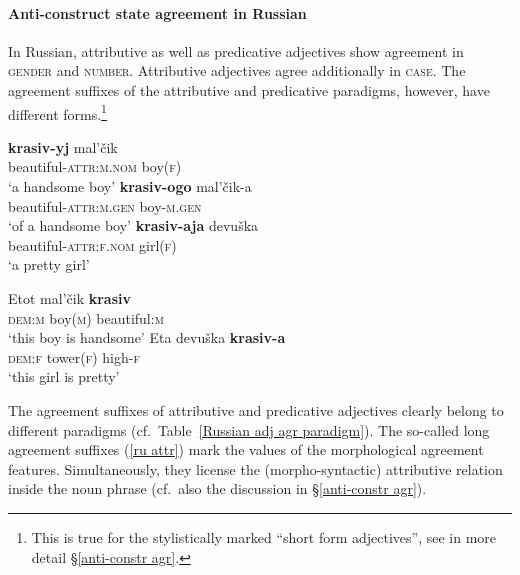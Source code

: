 \paragraph*{Anti\hyp{}construct state agreement in Russian}
\label{russian synchr}
In Russian, attributive as well as predicative adjectives show agreement in \textsc{gender} and \textsc{number}. Attributive adjectives agree additionally in \textsc{case}. The agreement suffixes of the attributive and predicative paradigms, however, have different forms.\footnote{This is true for the stylistically marked “short form adjectives”, see in more detail \S\ref{anti-constr agr}.}
\begin{exe}
\label{ru agr}
\begin{xlist}
\label{ru attr}
\begin{xlist}
\ex	
\gll	\textbf{krasiv-yj}			mal'čik\\
	beautiful-\textsc{attr:m.nom} 	boy(\textsc{f})\\
\glt	‘a handsome boy’
\ex	
\gll	\textbf{krasiv-ogo}			mal'čik-a\\
	beautiful-\textsc{attr:m.gen}	boy-\textsc{m.gen}\\
\glt	‘of a handsome boy’
\ex
\gll 	\textbf{krasiv-aja} 			devuška\\
	beautiful-\textsc{attr:f.nom}	girl(\textsc{f})\\
\glt	 ‘a pretty girl’
\end{xlist}
\begin{xlist}
\ex
\gll 	Etot 			mal'čik		\textbf{krasiv}\\
	\textsc{dem:m} boy(\textsc{m}) 	beautiful:\textsc{m}\\
\glt	 ‘this boy is handsome’
\ex	
\gll	Eta 			devuška		\textbf{krasiv-a}\\
	\textsc{dem:f} tower(\textsc{f}) 	high-\textsc{f}\\
\glt	‘this girl is pretty’
\end{xlist}
\end{xlist}
\end{exe}
The agreement suffixes of attributive and predicative adjectives clearly belong to different paradigms (cf.~Table~\ref{Russian adj agr paradigm}). The so-called long agreement suffixes (\ref{ru attr}) mark the values of the morphological agreement features. Simultaneously, they license the (morpho-syntactic) attributive relation inside the noun phrase (cf.~also the discussion in \S\ref{anti-constr agr}). 
